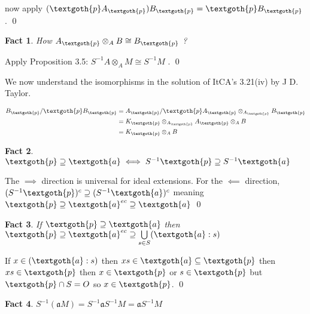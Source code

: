 \documentclass{article}
\newcommand{\mf}{\mathfrak}
\newcommand{\aaa}{\mf a}
\newtheorem{theorem}{Fact}[section]
\begin{document}
\noindent
now apply $(\textgoth{p} A_\textgoth{p}) B_\textgoth{p} = \textgoth{p} B_\textgoth{p}$ . 
\qed

\vspace{1.5em}
\begin{theorem}
How $A_\textgoth{p} \otimes_A B \cong B_\textgoth{p}$ ?
\end{theorem}

Apply Proposition 3.5: $S^{-1}A \otimes_A M \cong S^{-1}M$ . 
\qed

\vspace{1em}
We now understand the isomorphisms in the solution of ItCA's 3.21(iv) by J D. Taylor.

\begin{equation*}
\begin{split}
 B_\textgoth{p}/\textgoth{p}B_\textgoth{p} 
 & = A_\textgoth{p}/\textgoth{p}A_\textgoth{p} 
 \otimes_{A_\textgoth{p}} B_\textgoth{p} \\ 
 & = K_\textgoth{p} \otimes_{A_\textgoth{p}} A_\textgoth{p} \otimes_A B \\
 & = K_\textgoth{p} \otimes_A B
\end{split}
\end{equation*}

\bigskip
\begin{theorem}
$\textgoth{p} \supseteq \textgoth{a} \iff S^{-1}\textgoth{p} \supseteq S^{-1}\textgoth{a}$
\end{theorem}

\noindent
The $\implies$ direction is universal for ideal extensions. For the $\impliedby$ direction, 
$(S^{-1}\textgoth{p})^c \supseteq (S^{-1}\textgoth{a})^c$ meaning $\textgoth{p} \supseteq \textgoth{a}^{ec} \supseteq \textgoth{a}$
\qed

\vspace{1.5em}
\begin{theorem}
If $\textgoth{p} \supseteq \textgoth{a}$ then $\textgoth{p} \supseteq \textgoth{a}^{ec} \supseteq \bigcup\limits_{s \in S} (\textgoth{a}:s)$
\end{theorem}

\noindent
If $x \in (\textgoth{a}:s)$ then $xs \in \textgoth{a} \subseteq \textgoth{p}$ then $xs \in \textgoth{p}$ then $x \in \textgoth{p}$ or $s \in \textgoth{p}$ but $\textgoth{p} \cap S = O$ so $x \in \textgoth{p}$. 
\qed

\begin{theorem}
$S^{-1}(\aaa M) = S^{-1}\aaa S^{-1}M = \aaa S^{-1}M$
\end{theorem}
\end{document}
